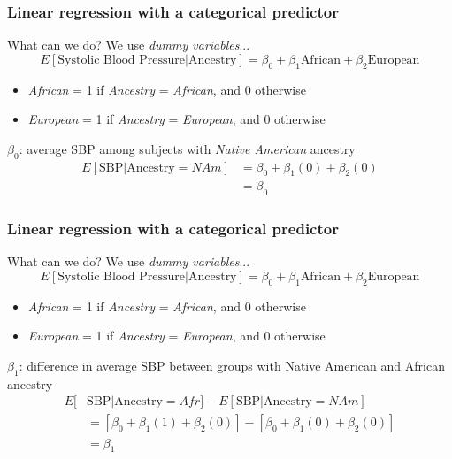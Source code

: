 \documentclass[12pt, 
hyperref={colorlinks=true, linkcolor=blue, urlcolor=cyan}]{beamer}
\begin{document}
\begin{frame}
\frametitle{Linear regression with a categorical predictor}
What can we do? \pause We use \textit{dummy variables}...
$$E[\text{Systolic Blood Pressure}|\text{Ancestry}] = \beta_0 + \beta_1 \text{African} + \beta_2 \text{European}$$

\vspace{-0.5cm}
\begin{itemize}
\item \textit{African} = 1 if \textit{Ancestry} = \textit{African}, and 0 otherwise
\item \textit{European} = 1 if \textit{Ancestry} = \textit{European}, and 0 otherwise
\end{itemize}\pause

$\beta_0$: average SBP among subjects with \textit{Native American} ancestry
\begin{align*}
E[\text{SBP}|\text{Ancestry} = NAm] &= \beta_0 + \beta_1(0) + \beta_2(0) \\
& = \beta_0
\end{align*}
\end{frame}

\begin{frame}
\frametitle{Linear regression with a categorical predictor}
What can we do? We use \textit{dummy variables}...
$$E[\text{Systolic Blood Pressure}|\text{Ancestry}] = \beta_0 + \beta_1 \text{African} + \beta_2 \text{European}$$

\vspace{-0.5cm}
\begin{itemize}
\item \textit{African} = 1 if \textit{Ancestry} = \textit{African}, and 0 otherwise
\item \textit{European} = 1 if \textit{Ancestry} = \textit{European}, and 0 otherwise
\end{itemize}

$\beta_1$: difference in average SBP between groups with Native American and African ancestry
\begin{align*}
E[&\text{SBP}|\text{Ancestry} = Afr] - E[\text{SBP}|\text{Ancestry} = NAm] \\
&= \left[\beta_0 + \beta_1(1) + \beta_2(0)\right] - \left[\beta_0 + \beta_1(0) + \beta_2(0) \right] \\
& = \beta_1
\end{align*}
\end{frame}
\end{document}
